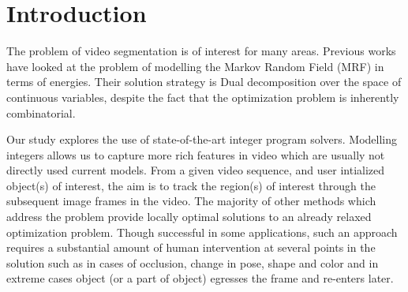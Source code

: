 \section{Introduction}

The problem of video segmentation is of interest for many areas. 
Previous works \cite{Komodakis2007a, Komodakis2011a} \cite{Tsai2010}
have looked at the problem of modelling the Markov Random Field (MRF) in terms of energies. 
Their solution strategy is Dual decomposition over the space of continuous variables, despite the fact that the optimization problem is inherently combinatorial.

Our study explores the use of state-of-the-art integer program solvers. Modelling integers
allows us to capture more rich features in video which are usually not directly used current 
models. 
From a given video sequence, and user intialized object(s)
of interest, the aim is to track the region(s) of interest through
the subsequent image frames in the video. The majority of other
methods which address the problem provide locally optimal
solutions to an already relaxed optimization problem. Though successful in some applications, such an approach
requires a substantial amount of human intervention
at several points in the solution such as in cases of occlusion,
change in pose, shape and color and in extreme cases object
(or a part of object) egresses the frame and re-enters later.
